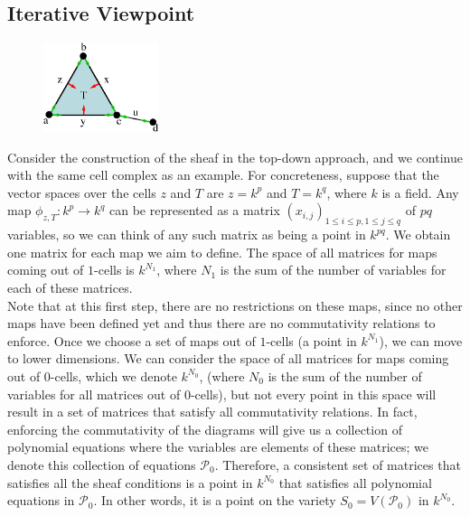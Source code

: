 \documentclass{article}
\newcommand{\cP}{\mathcal{P}}
\theoremstyle{definition}
\begin{document}
\subsection{Iterative Viewpoint}
\begin{figure}[!htbp]
\centering
	\includegraphics[width=0.3\textwidth]{images/triangle_step2.eps}
\end{figure}

Consider the construction of the sheaf in the top-down approach, and we continue with the same cell complex as an example. For concreteness, suppose that the vector spaces over the cells $z$ and $T$ are $z =k^p$ and $T = k^q$, where $k$ is a field. Any map $\phi_{z,T} : k^p \rightarrow k^q$ can be represented as a matrix $(x_{i,j})_{1\leq i \leq p, 1 \leq j \leq q}$ of $pq$ variables, so we can think of any such matrix as being a point in $k^{pq}$. We obtain one matrix for each map we aim to define. The space of all matrices for maps coming out of $1$-cells is $k^{N_1}$, where $N_1$ is the sum of the number of variables for each of these matrices.\\

Note that at this first step, there are no restrictions on these maps, since no other maps have been defined yet and thus there are no commutativity relations to enforce. Once we choose a set of maps out of $1$-cells (a point in $k^{N_1}$), we can move to lower dimensions. We can consider the space of all matrices for maps coming out of $0$-cells, which we denote $k^{N_0}$, (where $N_0$ is the sum of the number of variables for all matrices out of $0$-cells), but not every point in this space will result in a set of matrices that satisfy all commutativity relations. In fact, enforcing the commutativity of the diagrams will give us a collection of polynomial equations where the variables are elements of these matrices; we denote this collection of equations $\cP_0$. Therefore, a consistent set of matrices that satisfies all the sheaf conditions is a point in $k^{N_0}$ that satisfies all polynomial equations in $\cP_0$. In other words, it is a point on the variety $S_0 = V(\cP_0)$ in $k^{N_0}$.\\
\end{document}

